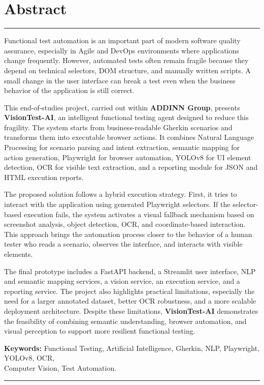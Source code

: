 \chapter*{Abstract}
\hrule
\vspace{1.2cm}

Functional test automation is an important part of modern software quality assurance, especially in Agile and DevOps environments where applications change frequently. However, automated tests often remain fragile because they depend on technical selectors, DOM structure, and manually written scripts. A small change in the user interface can break a test even when the business behavior of the application is still correct.

This end-of-studies project, carried out within \textbf{ADDINN Group}, presents \textbf{VisionTest-AI}, an intelligent functional testing agent designed to reduce this fragility. The system starts from business-readable Gherkin scenarios and transforms them into executable browser actions. It combines Natural Language Processing for scenario parsing and intent extraction, semantic mapping for action generation, Playwright for browser automation, YOLOv8 for UI element detection, OCR for visible text extraction, and a reporting module for JSON and HTML execution reports.

The proposed solution follows a hybrid execution strategy. First, it tries to interact with the application using generated Playwright selectors. If the selector-based execution fails, the system activates a visual fallback mechanism based on screenshot analysis, object detection, OCR, and coordinate-based interaction. This approach brings the automation process closer to the behavior of a human tester who reads a scenario, observes the interface, and interacts with visible elements.

The final prototype includes a FastAPI backend, a Streamlit user interface, NLP and semantic mapping services, a vision service, an execution service, and a reporting service. The project also highlights practical limitations, especially the need for a larger annotated dataset, better OCR robustness, and a more scalable deployment architecture. Despite these limitations, \textbf{VisionTest-AI} demonstrates the feasibility of combining semantic understanding, browser automation, and visual perception to support more resilient functional testing.

\textbf{Keywords:} Functional Testing, Artificial Intelligence, Gherkin, NLP, Playwright, YOLOv8, OCR,\\
Computer Vision, Test Automation.

\vspace{1.2cm}
\hrule
\vfill
